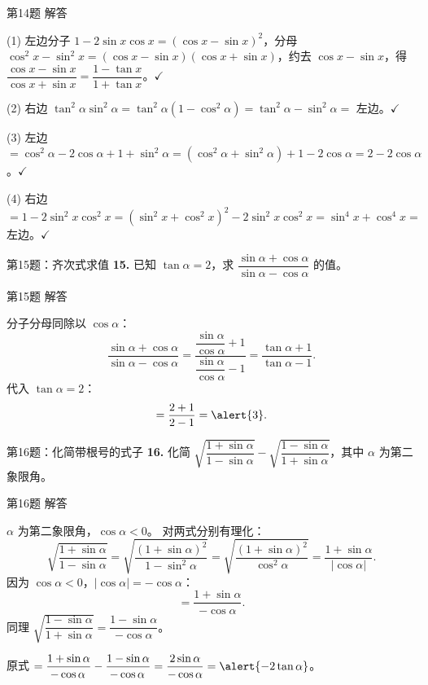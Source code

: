 \documentclass[10pt,aspectratio=169,serif]{beamer}
\begin{document}
\begin{frame}[t]{第14题 解答}
\begin{tcolorbox}[colback=orange!10,colframe=orange,title=\textbf{证明}]
\small
(1) 左边分子 $1-2\sin x\cos x=(\cos x-\sin x)^2$，分母 $\cos^2 x-\sin^2 x=(\cos x-\sin x)(\cos x+\sin x)$，约去 $\cos x-\sin x$，得 $\dfrac{\cos x-\sin x}{\cos x+\sin x}=\dfrac{1-\tan x}{1+\tan x}$。$\checkmark$

(2) 右边 $\tan^2\alpha\sin^2\alpha=\tan^2\alpha(1-\cos^2\alpha)=\tan^2\alpha-\sin^2\alpha=$ 左边。$\checkmark$

(3) 左边 $=\cos^2\alpha-2\cos\alpha+1+\sin^2\alpha=(\cos^2\alpha+\sin^2\alpha)+1-2\cos\alpha=2-2\cos\alpha$。$\checkmark$

(4) 右边 $=1-2\sin^2 x\cos^2 x=(\sin^2 x+\cos^2 x)^2-2\sin^2 x\cos^2 x=\sin^4 x+\cos^4 x=$ 左边。$\checkmark$
\end{tcolorbox}
\end{frame}

\begin{frame}[t]{第15题：齐次式求值}
\textbf{15.} 已知 $\tan\alpha=2$，求 $\dfrac{\sin\alpha+\cos\alpha}{\sin\alpha-\cos\alpha}$ 的值。
\end{frame}

\begin{frame}[t]{第15题 解答}
\begin{tcolorbox}[colback=orange!10,colframe=orange,title=\textbf{解}]
分子分母同除以 $\cos\alpha$：
\[
\frac{\sin\alpha+\cos\alpha}{\sin\alpha-\cos\alpha}
= \frac{\dfrac{\sin\alpha}{\cos\alpha}+1}{\dfrac{\sin\alpha}{\cos\alpha}-1}
= \frac{\tan\alpha+1}{\tan\alpha-1}.
\]
代入 $\tan\alpha=2$：
\[
= \frac{2+1}{2-1} = \alert{3}.
\]
\end{tcolorbox}
\end{frame}

\begin{frame}[t]{第16题：化简带根号的式子}
\textbf{16.} 化简 $\sqrt{\dfrac{1+\sin\alpha}{1-\sin\alpha}}-\sqrt{\dfrac{1-\sin\alpha}{1+\sin\alpha}}$，其中 $\alpha$ 为第二象限角。
\end{frame}

\begin{frame}[t]{第16题 解答}
\begin{tcolorbox}[colback=orange!10,colframe=orange,title=\textbf{解}]
$\alpha$ 为第二象限角，$\cos\alpha<0$。
对两式分别有理化：
\[
\sqrt{\frac{1+\sin\alpha}{1-\sin\alpha}}
= \sqrt{\frac{(1+\sin\alpha)^2}{1-\sin^2\alpha}}
= \sqrt{\frac{(1+\sin\alpha)^2}{\cos^2\alpha}}
= \frac{1+\sin\alpha}{|\cos\alpha|}.
\]
因为 $\cos\alpha<0$，$|\cos\alpha|=-\cos\alpha$：
\[
= \frac{1+\sin\alpha}{-\cos\alpha}.
\]
同理 $\sqrt{\dfrac{1-\sin\alpha}{1+\sin\alpha}}=\dfrac{1-\sin\alpha}{-\cos\alpha}$。

原式 $=\dfrac{1+\sin\alpha}{\!-\cos\alpha}-\dfrac{1-\sin\alpha}{\!-\cos\alpha}=\dfrac{2\sin\alpha}{-\cos\alpha}=\alert{-2\tan\alpha}$。
\end{tcolorbox}
\end{frame}
\end{document}
